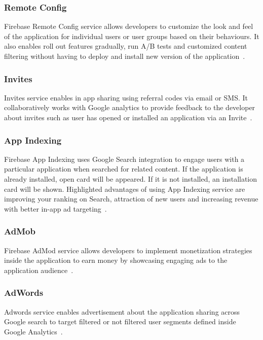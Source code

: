 \subsubsection{Remote Config} Firebase Remote Config service allows
developers to customize the look and feel of the application for
individual users or user groups based on their behaviours. It also
enables roll out features gradually, run A/B tests and customized
content filtering without having to deploy and install new version of
the application~\cite{hid-sp18-409-www-firebase-products}.

\subsubsection{Invites} Invites service enables in app sharing using
referral codes via email or SMS. It collaboratively works with Google
analytics to provide feedback to the developer about invites such as
user has opened or installed an application via an
Invite~\cite{hid-sp18-409-www-firebase-products,
  hid-sp18-409-www-firebase-invite}.

\subsubsection{App Indexing} Firebase App Indexing uses Google Search
integration to engage users with a particular application when
searched for related content. If the application is already installed,
open card will be appeared. If it is not installed, an installation
card will be shown.  Highlighted advantages of using App Indexing
service are improving your ranking on Search, attraction of new users
and increasing revenue with better in-app ad
targeting~\cite{hid-sp18-409-www-firebase-products}.

\subsubsection{AdMob} Firebase AdMod service allows developers to
implement monetization strategies inside the application to earn money
by showcasing engaging ads to the application
audience~\cite{hid-sp18-409-www-firebase-admob}.

\subsubsection{AdWords} Adwords service enables advertisement about
the application sharing across Google search to target filtered or not
filtered user segments defined inside Google
Analytics~\cite{hid-sp18-409-www-firebase-adwords}.


